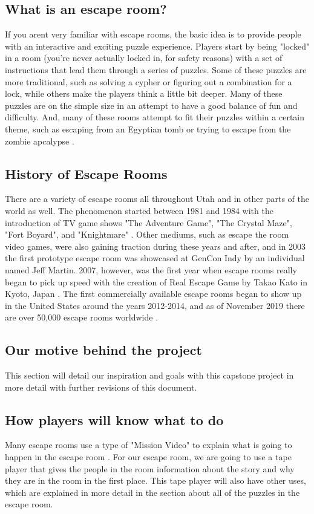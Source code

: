 \documentclass[conference]{IEEEtran}
\begin{document}
\subsection*{What is an escape room?}
If you arent very familiar with escape rooms, the basic idea is to provide people with an interactive
and exciting puzzle experience. Players start by being "locked" in a room (you're never actually locked
in, for safety reasons) with a set of instructions that lead them through a series of puzzles. Some of
these puzzles are more traditional, such as solving a cypher or figuring out a combination for a lock,
while others make the players think a little bit deeper. Many of these puzzles are on the simple size in
an attempt to have a good balance of fun and difficulty. And, many of these rooms attempt to fit their
puzzles within a certain theme, such as escaping from an Egyptian tomb or trying to escape from the zombie
apcalypse \cite{wikipediaEscapeRoom}.

\subsection*{History of Escape Rooms}
There are a variety of escape rooms all throughout Utah and in other parts of the world as well. The phenomenon
started between 1981 and 1984 with the introduction of TV game shows "The Adventure Game", "The Crystal Maze",
"Fort Boyard", and "Knightmare" \cite{wikipediaEscapeRoom}. Other mediums, such as escape the room video games, were also gaining traction
during these years and after, and in 2003 the first prototype escape room was showcased at GenCon Indy by
an individual named Jeff Martin. 2007, however, was the first year when escape rooms really began to pick up speed
with the creation of Real Escape Game by Takao Kato in Kyoto, Japan \cite{whatIsAnEscapeRoom}. The first commercially available escape rooms
began to show up in the United States around the years 2012-2014, and as of November 2019 there are over 50,000 escape
rooms worldwide \cite{wikipediaEscapeRoom}.

\subsection*{Our motive behind the project}
This section will detail our inspiration and goals with this capstone project
in more detail with further revisions of this document.

\subsection*{How players will know what to do}
Many escape rooms use a type of "Mission Video" to explain what is going to happen in the escape room \cite{whatIsAnEscapeRoom}.
For our escape room, we are going to use a tape player that gives the people in the room information about
the story and why they are in the room in the first place. This tape player will also have other uses, which are
explained in more detail in the section about all of the puzzles in the escape room.
\end{document}
